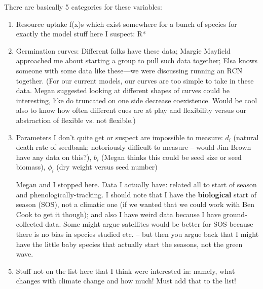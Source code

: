 \documentclass[11pt,a4paper,oneside]{article}
\begin{document}
\noindent There are basically 5 categories for these variables:
\begin{enumerate}
\item Resource uptake f(x)s which exist somewhere for a bunch of species for exactly the model stuff here I suspect: R*
\item Germination curves: Different folks have these data; Margie Mayfield approached me about starting a group to pull such data together; Elsa knows someone with some data like these---we were discussing running an RCN together. (For our current models, our curves are too simple to take in these data. Megan suggested looking at different shapes of curves could be interesting, like do truncated on one side decrease coexistence. Would be cool also to know how often different cues are at play and flexibility versus our abstraction of flexible vs. not flexible.) %
\item Parameters I don't quite get or suspect are impossible to measure: \(d_{i}\) (natural death rate of seedbank; notoriously difficult to measure -- would Jim Brown have any data on this?), \(b_{i}\) (Megan thinks this could be seed size or seed biomass), \(\phi_{i}\) (dry weight versus seed number)
\item [Megan and I stopped here.] Data I actually have: related all to start of season and phenologically-tracking. I should note that I have the {\bf biological} start of season (SOS), not a climatic one (if we wanted that we could work with Ben Cook to get it though); and also I have weird data because I have ground-collected data. Some might argue satellites would be better for SOS because there is no bias in species studied etc. -- but then you argue back that I might have the little baby species that actually start the seasons, not the green wave.
\item Stuff not on the list here that I think were interested in: namely, what changes with climate change and how much! Must add that to the list!
\end{enumerate}


%
%
\end{document}
